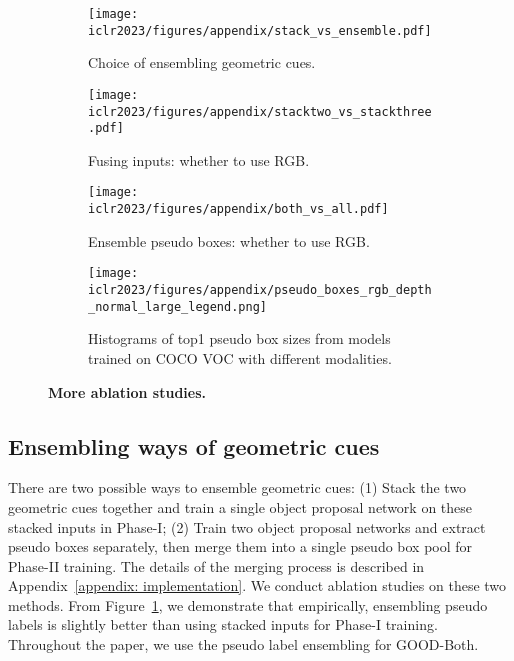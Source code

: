 \documentclass{article} \usepackage{iclr2023_conference,times}
\begin{document}
\begin{figure}[t]\centering
    \begin{subfigure}[b]{0.48\textwidth}
         \centering
         \texttt{[image: iclr2023/figures/appendix/stack\_vs\_ensemble.pdf]}
    \caption{Choice of ensembling geometric cues.}
         \label{fig:ensemble_geometric_cues}
     \end{subfigure} 
     \hfill
     \begin{subfigure}[b]{0.48\textwidth}
         \centering
         \texttt{[image: iclr2023/figures/appendix/stacktwo\_vs\_stackthree.pdf]}
         \caption{Fusing inputs: whether to use RGB.}
         \label{fig:stacking}
     \end{subfigure} 
     \begin{subfigure}[b]{0.48\textwidth}
         \centering
         \texttt{[image: iclr2023/figures/appendix/both\_vs\_all.pdf]}
         \caption{Ensemble pseudo boxes: whether to use RGB.}
         \label{fig:goodall}
     \end{subfigure} 
     \vspace{0.2em}
     \begin{subfigure}[b]{0.5\textwidth}
         \centering
         \texttt{[image: iclr2023/figures/appendix/pseudo\_boxes\_rgb\_depth\_normal\_large\_legend.png]}
         \caption{Histograms of top1 pseudo box sizes from models trained on COCO VOC with different modalities.}
         \label{fig:pseudo_box_histogram}
     \end{subfigure}
  \caption{\textbf{More ablation studies.} }\label{fig:more_ablation}
\end{figure}


\subsection{Ensembling ways of geometric cues}
There are two possible ways to ensemble geometric cues: (1) Stack the two geometric cues together and train a single object proposal network on these stacked inputs in Phase-I; (2) Train two  object proposal networks and extract pseudo boxes separately, then merge them into a single pseudo box pool for Phase-II training. The details of the merging process is described in Appendix~\ref{appendix: implementation}. We conduct ablation studies on these two methods. From Figure~\ref{fig:ensemble_geometric_cues}, we demonstrate that empirically, ensembling pseudo labels is slightly better than using stacked inputs for Phase-I training. Throughout the paper, we use the pseudo label ensembling for GOOD-Both.
\end{document}
